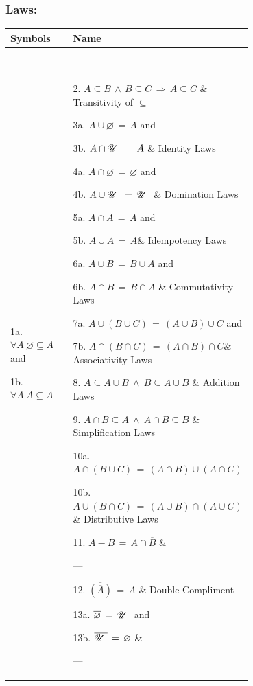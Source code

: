\subsubsection*{Laws:}
\noindent
\begin{tabular}{p{0.4\linewidth}|p{0.3\linewidth}}
\centering Symbols &\centering Name \tabularnewline\hline
1a. $\forall A\ \varnothing\subseteq A$ and\par 1b. $\forall A\ A\subseteq A$ &  \parbox{1in}{\centering ---} \tabularnewline

2. $A\subseteq B\, \land\, B\subseteq C\, \Rightarrow\, A\subseteq C$ &  Transitivity of $\subseteq$ \tabularnewline

3a. $A\cup \varnothing\, =\, A$ and\par 3b. $A\cap\mbox{$\mathscr{U}\ $}\, =\, A$ & Identity Laws \tabularnewline

4a. $A\cap\varnothing\, =\, \varnothing$ and\par 4b. $A\cup\mbox{$\mathscr{U}\ $}\, =\, \mbox{$\mathscr{U}\ $}$ & Domination Laws \tabularnewline

5a. $A\cap A\, =\, A$ and\par 5b. $A\cup A\, =\, A$& Idempotency Laws\tabularnewline

6a. $A\cup B\, =\, B\cup A$ and\par 6b. $A\cap B\, =\, B\cap A$ & Commutativity Laws \tabularnewline

7a. $A\cup(B \cup C)\, =\, (A\cup B) \cup C$ and \par 
7b. $A\cap(B \cap C)\, =\, (A\cap B) \cap C$& Associativity Laws \tabularnewline

8. $A\subseteq A\cup B\ \land\ B\subseteq A\cup B$ & Addition Laws \tabularnewline

9. $A\cap B\subseteq A\ \land\ A\cap B\subseteq B$ & Simplification Laws\tabularnewline

10a. $A\cap(B\cup C)\, =\, (A\cap B)\cup(A\cap C)$ \par
10b. $A\cup(B\cap C)\, =\, (A\cup B)\cap(A\cup C)$ & Distributive Laws \tabularnewline

11. $A-B\, =\, A\cap \overline{B}$ &  \parbox{1in}{\centering ---} \tabularnewline

12. $\overline{\left(\overline{A}\right)}\, =\, A$ & Double Compliment \tabularnewline

13a. $\overline{\varnothing}\, =\, \mbox{$\mathscr{U}\ $}$ and\par 13b. $\overline{\mbox{$\mathscr{U}\ $}}\, =\, \varnothing$ & \parbox{1in}{\centering ---} \tabularnewline


\end{tabular}
